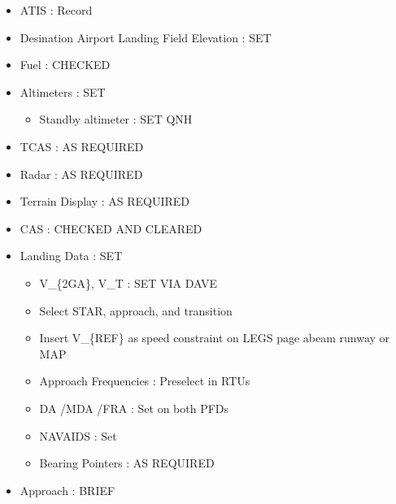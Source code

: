 \begin{itemize}
\item ATIS : Record

\item Desination Airport Landing Field Elevation : SET

\item Fuel : CHECKED

\item Altimeters : SET

\begin{itemize}
\item Standby altimeter : SET QNH

\end{itemize}

\item TCAS : AS REQUIRED

\item Radar : AS REQUIRED

\item Terrain Display : AS REQUIRED

\item CAS : CHECKED AND CLEARED

\item Landing Data : SET

\begin{itemize}
\item V\_\{2GA\}, V\_T : SET VIA DAVE

\item Select STAR, approach, and transition

\item Insert V\_\{REF\} as speed constraint on LEGS page abeam runway or MAP

\item Approach Frequencies : Preselect in RTUs

\item DA \slash  MDA \slash  FRA : Set on both PFDs

\item NAVAIDS : Set

\item Bearing Pointers : AS REQUIRED

\end{itemize}

\item Approach : BRIEF

\end{itemize}

